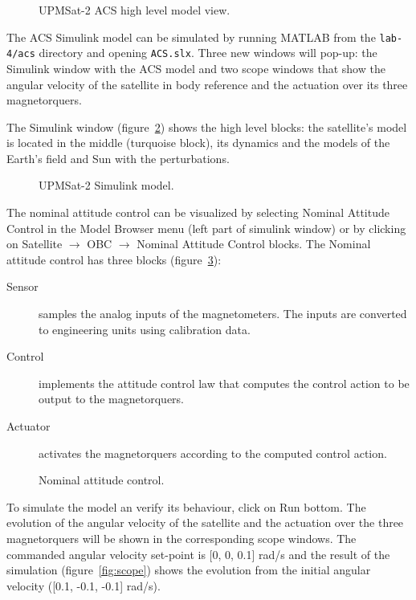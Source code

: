 \begin{figure}[hbtp!]
    \caption{UPMSat-2 ACS high level model view.}
    \label{fig:acs-hl}
\end{figure}

The ACS Simulink model can be simulated by running MATLAB from the
\textcolor{mPurple}{\texttt{lab-4/acs}}
directory and opening \texttt{ACS.slx}.
Three new windows will pop-up: the Simulink window with the ACS model
and two scope windows that show the angular velocity of the satellite in body reference and the actuation over its three magnetorquers.

The Simulink window (figure~\ref{fig:acs-simulink}) shows the high level blocks: the satellite's model is located in the middle (turquoise block),
its dynamics and the models of the Earth's field and Sun with the perturbations.

\begin{figure}[hbtp!]
    \caption{UPMSat-2 Simulink model.}
    \label{fig:acs-simulink}
\end{figure}

The nominal attitude control can be visualized
by selecting Nominal Attitude Control in the Model Browser menu
(left part of simulink window) or by clicking on Satellite $\rightarrow$ OBC $\rightarrow$ Nominal Attitude Control blocks. The Nominal attitude control has three blocks (figure~\ref{fig:nac}):
\begin{description}
\item[Sensor] samples the analog inputs of the magnetometers. The inputs are converted to engineering units using calibration data.
\item[Control] implements the attitude control law that computes the control action to be output to the magnetorquers.
\item[Actuator] activates the magnetorquers according to the computed control action.
\end{description}

\begin{figure}[H]
            \caption{Nominal attitude control.}
            \label{fig:nac}
\end{figure}

To simulate the model an verify its behaviour,
click on Run bottom.
The evolution of the angular velocity of the satellite
and the actuation over the three magnetorquers will be shown in the corresponding scope windows.
The commanded angular velocity set-point is [0, 0, 0.1] rad/s
and the result of the simulation (figure~\ref{fig:scope})
shows the evolution from the initial angular velocity ([0.1, -0.1, -0.1] rad/s).

